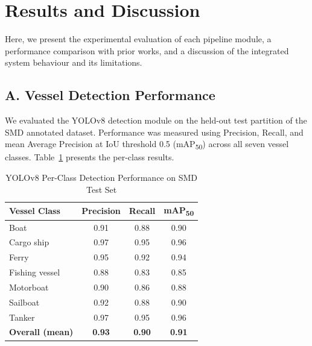 \documentclass{ieeeaccess}
\begin{document}
\section{Results and Discussion}
\label{sec:results}

Here, we present the experimental evaluation of each pipeline 
module, a performance comparison with prior works, and a discussion 
of the integrated system behaviour and its limitations.

\subsection*{A. Vessel Detection Performance}

We evaluated the YOLOv8 detection module on the held-out test 
partition of the SMD annotated dataset. Performance was measured 
using Precision, Recall, and mean Average Precision at IoU 
threshold 0.5 (mAP\textsubscript{50}) across all seven vessel 
classes. Table~\ref{tab:detection} presents the per-class results.

\begin{table}[H]
\centering
\caption{YOLOv8 Per-Class Detection Performance on SMD Test Set}
\label{tab:detection}
\begin{tabular}{|l|c|c|c|}
\hline
\cellcolor{gray!30}\textbf{Vessel Class} &
\cellcolor{gray!30}\textbf{Precision} &
\cellcolor{gray!30}\textbf{Recall} &
\cellcolor{gray!30}\textbf{mAP\textsubscript{50}} \\
\hline
Boat            & 0.91 & 0.88 & 0.90 \\
Cargo ship      & 0.97 & 0.95 & 0.96 \\
Ferry           & 0.95 & 0.92 & 0.94 \\
Fishing vessel  & 0.88 & 0.83 & 0.85 \\
Motorboat       & 0.90 & 0.86 & 0.88 \\
Sailboat        & 0.92 & 0.88 & 0.90 \\
Tanker          & 0.97 & 0.95 & 0.96 \\
\hline
\textbf{Overall (mean)} & \textbf{0.93} & \textbf{0.90} & \textbf{0.91} \\
\hline
\end{tabular}
\end{table}
\end{document}
